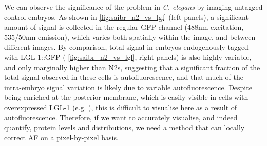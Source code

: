 \documentclass[12pt]{"report"}
\begin{document}
We can observe the significance of the problem in \textit{C. elegans} by imaging untagged control embryos. As shown in \cref{fig:saibr_n2_vs_lgl} (left panels), a significant amount of signal is collected in the regular GFP channel (488nm excitation, 535/50nm emission), which varies both spatially within the image, and between different images. By comparison, total signal in embryos endogenously tagged with LGL-1::GFP ( \cref{fig:saibr_n2_vs_lgl}, right panels) is also highly variable, and only marginally higher than N2s, suggesting that a significant fraction of the total signal observed in these cells is autofluorescence, and that much of the intra-embryo signal variation is likely due to variable autofluorescence. Despite being enriched at the posterior membrane, which is easily visible in cells with overexpressed LGL-1 (e.g. \cite{Hoege2010}), this is difficult to visualise here as a result of autofluorescence. Therefore, if we want to accurately visualise, and indeed quantify, protein levels and distributions, we need a method that can locally correct AF on a pixel-by-pixel basis.\\
\end{document}
